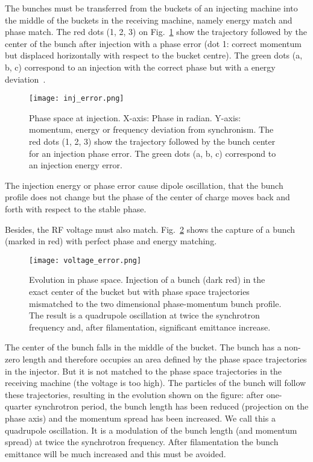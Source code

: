 The bunches must be transferred from the buckets of an injecting machine into the middle of the buckets in the receiving machine, namely energy match and phase match. The red dots (1, 2, 3) on Fig.~\ref{inj_error} show the trajectory followed by the center of the bunch after injection with a phase error (dot 1: correct momentum but displaced horizontally with respect to the bucket centre). The green dots (a, b, c) correspond to an injection with the correct phase but with a energy deviation~\cite{baudrenghien_low-level_2010}. 
\begin{figure}[!htb]
   \centering   
   \texttt{[image: inj\_error.png]}
   \caption{Phase space at injection. X-axis: Phase in radian. Y-axis: momentum, energy or frequency deviation
from synchronism. The red dots (1, 2, 3) show the trajectory followed by the bunch center for an injection phase error. The green dots (a, b, c) correspond to an injection energy error.~\cite{baudrenghien_low-level_2010}}
   \label{inj_error}
\end{figure}

The injection energy or phase error cause dipole oscillation, that the bunch profile does not change but the phase of the center of charge moves back and forth with respect to the stable phase. 

Besides, the RF voltage must also match. Fig.~\ref{voltage_error} shows the capture of a bunch (marked in red) with perfect phase and energy matching. 
\begin{figure}[H]
   \centering   
   \texttt{[image: voltage\_error.png]}
   \caption{Evolution in phase space. Injection of a bunch (dark red) in the exact center of the bucket but with phase space trajectories mismatched to the two dimensional phase-momentum bunch profile. The result is a quadrupole oscillation at twice the synchrotron frequency and, after filamentation, significant emittance increase.~\cite{baudrenghien_low-level_2010}}
   \label{voltage_error}
\end{figure}

The center of the bunch falls in the middle of the bucket. The bunch has a non-zero length and therefore occupies an area defined by the
phase space trajectories in the injector. But it is not matched to the phase space trajectories in the receiving machine (the voltage is too high). The particles of the bunch will follow these trajectories, resulting in the evolution shown on the figure: after one-quarter synchrotron period, the bunch length has been reduced (projection on the phase axis) and the momentum spread has been increased. We call
this a quadrupole oscillation. It is a modulation of the bunch length (and momentum spread) at twice the synchrotron frequency. After filamentation the bunch emittance will be much increased and this must be avoided.~\cite{baudrenghien_low-level_2010}


